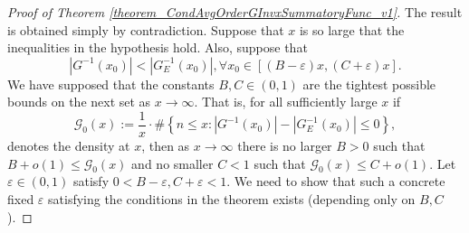 \documentclass[11pt,reqno,a4letter]{article}
\numberwithin{figure}{section}
\numberwithin{table}{section}
\theoremstyle{plain}
\numberwithin{theorem}{section}
\theoremstyle{definition}
\begin{document}
\begin{proof}[Proof of Theorem \ref{theorem_CondAvgOrderGInvxSummatoryFunc_v1}] 
\label{proofOf_theorem_CondAvgOrderGInvxSummatoryFunc_v1} 
The result is obtained simply by contradiction. Suppose that $x$ is so large that the inequalities in the 
hypothesis hold. Also, suppose that 
\begin{equation} 
\label{eqn_proof_tag_IneqSetG0x0_DNHold_v1} 
|G^{-1}(x_0)| < |G_E^{-1}(x_0)|, \forall x_0 \in [(B-\varepsilon) x, (C+\varepsilon) x]. 
\end{equation} 
We have supposed that the constants $B,C \in (0, 1)$ are the tightest possible bounds on the next set as 
$x \rightarrow \infty$. 
That is, for all sufficiently large $x$ if 
$$\mathcal{G}_0(x) := \frac{1}{x} \cdot \#\left\{n \leq x: |G^{-1}(x_0)| - |G_E^{-1}(x_0)| \leq 0\right\},$$ 
denotes the density at $x$, then as $x \rightarrow \infty$ 
there is no larger $B > 0$ such that $B+o(1) \leq \mathcal{G}_0(x)$ and 
no smaller $C < 1$ such that $\mathcal{G}_0(x) \leq C + o(1)$. 
Let $\varepsilon \in (0, 1)$ satisfy $0 < B - \varepsilon, C + \varepsilon < 1$. We need to show that such a 
concrete fixed $\varepsilon$ satisfying the conditions in the theorem exists (depending only on $B,C$). 


\end{proof}
\end{document}
